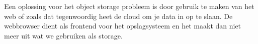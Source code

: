 Een oplossing voor het object storage probleem is door gebruik te maken van het web of zoals dat tegenwoordig heet de cloud om je data in op te slaan. De webbrowser dient als frontend voor het opslagsysteem en het maakt dan niet meer uit wat we gebruiken als storage.
